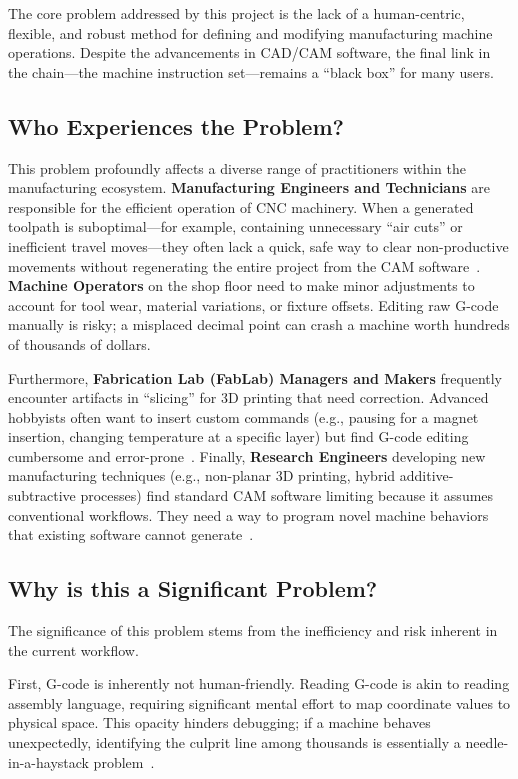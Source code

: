 The core problem addressed by this project is the lack of a human-centric, flexible, and robust method for defining and modifying manufacturing machine operations. Despite the advancements in CAD/CAM software, the final link in the chain—the machine instruction set—remains a ``black box'' for many users.

\subsection{Who Experiences the Problem?}

This problem profoundly affects a diverse range of practitioners within the manufacturing ecosystem. \textbf{Manufacturing Engineers and Technicians} are responsible for the efficient operation of CNC machinery. When a generated toolpath is suboptimal—for example, containing unnecessary ``air cuts'' or inefficient travel moves—they often lack a quick, safe way to clear non-productive movements without regenerating the entire project from the CAM software~\cite{abdeljabbar_digital_2025}. \textbf{Machine Operators} on the shop floor need to make minor adjustments to account for tool wear, material variations, or fixture offsets. Editing raw G-code manually is risky; a misplaced decimal point can crash a machine worth hundreds of thousands of dollars.

Furthermore, \textbf{Fabrication Lab (FabLab) Managers and Makers} frequently encounter artifacts in ``slicing'' for 3D printing that need correction. Advanced hobbyists often want to insert custom commands (e.g., pausing for a magnet insertion, changing temperature at a specific layer) but find G-code editing cumbersome and error-prone~\cite{mavri_survey_2021}. Finally, \textbf{Research Engineers} developing new manufacturing techniques (e.g., non-planar 3D printing, hybrid additive-subtractive processes) find standard CAM software limiting because it assumes conventional workflows. They need a way to program novel machine behaviors that existing software cannot generate~\cite{riffel_artificial_2025}.

\subsection{Why is this a Significant Problem?}

The significance of this problem stems from the inefficiency and risk inherent in the current workflow.

First, G-code is inherently not human-friendly. Reading G-code is akin to reading assembly language, requiring significant mental effort to map coordinate values to physical space. This opacity hinders debugging; if a machine behaves unexpectedly, identifying the culprit line among thousands is essentially a needle-in-a-haystack problem~\cite{tiro_rapid_2025}.

